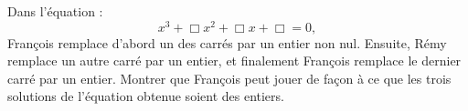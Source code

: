 Dans l'équation :
\[
x^3 + \Box x^2 + \Box x + \Box = 0,
\]
François remplace d'abord un des carrés par un entier non nul. Ensuite, Rémy remplace un autre carré par un entier, et finalement François remplace le dernier carré par un entier. Montrer que François peut jouer de façon à ce que les trois solutions de l'équation obtenue soient des entiers.
